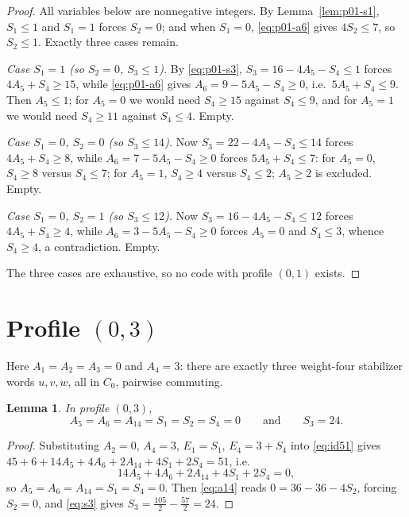 \documentclass[11pt]{amsart}
\newtheorem{lemma}[theorem]{Lemma}
\theoremstyle{definition}
\theoremstyle{remark}
\begin{document}
\begin{proof}
All variables below are nonnegative integers.  By Lemma~\ref{lem:p01-s1},
$S_1\le1$ and $S_1=1$ forces $S_2=0$; and when $S_1=0$,
\eqref{eq:p01-a6} gives $4S_2\le7$, so $S_2\le1$.  Exactly three cases
remain.

\emph{Case $S_1=1$ (so $S_2=0$, $S_3\le1$).}  By \eqref{eq:p01-s3},
$S_3=16-4A_5-S_4\le 1$ forces $4A_5+S_4\ge15$, while \eqref{eq:p01-a6}
gives $A_6=9-5A_5-S_4\ge0$, i.e.\ $5A_5+S_4\le9$.  Then $A_5\le1$; for
$A_5=0$ we would need $S_4\ge15$ against $S_4\le9$, and for $A_5=1$ we
would need $S_4\ge11$ against $S_4\le4$.  Empty.

\emph{Case $S_1=0$, $S_2=0$ (so $S_3\le14$).}  Now $S_3=22-4A_5-S_4\le14$
forces $4A_5+S_4\ge8$, while $A_6=7-5A_5-S_4\ge0$ forces $5A_5+S_4\le7$:
for $A_5=0$, $S_4\ge8$ versus $S_4\le7$; for $A_5=1$, $S_4\ge4$ versus
$S_4\le2$; $A_5\ge2$ is excluded.  Empty.

\emph{Case $S_1=0$, $S_2=1$ (so $S_3\le12$).}  Now
$S_3=16-4A_5-S_4\le12$ forces $4A_5+S_4\ge4$, while
$A_6=3-5A_5-S_4\ge0$ forces $A_5=0$ and $S_4\le3$, whence $S_4\ge4$,
a contradiction.  Empty.

The three cases are exhaustive, so no code with profile $(0,1)$ exists.
\end{proof}

\section{\texorpdfstring{Profile $(0,3)$}{Profile (0,3)}}\label{sec:p03}

Here $A_1=A_2=A_3=0$ and $A_4=3$: there are exactly three weight-four
stabilizer words $u,v,w$, all in $C_0$, pairwise commuting.

\begin{lemma}\label{lem:p03-forced}
In profile $(0,3)$,
\[
A_5=A_6=A_{14}=S_1=S_2=S_4=0
\qquad\text{and}\qquad
S_3=24 .
\]
\end{lemma}

\begin{proof}
Substituting $A_2=0$, $A_4=3$, $E_1=S_1$, $E_4=3+S_4$ into
\eqref{eq:id51} gives $45+6+14A_5+4A_6+2A_{14}+4S_1+2S_4=51$, i.e.
\[
14A_5+4A_6+2A_{14}+4S_1+2S_4=0 ,
\]
so $A_5=A_6=A_{14}=S_1=S_4=0$.  Then \eqref{eq:a14} reads
$0=36-36-4S_2$, forcing $S_2=0$, and \eqref{eq:s3} gives
$S_3=\tfrac{105}{2}-\tfrac{57}{2}=24$.
\end{proof}
\end{document}
